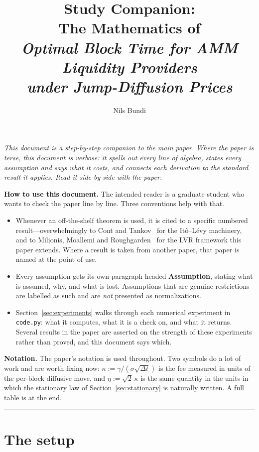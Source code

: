 \documentclass[11pt]{article}
\title{Study Companion: \\
The Mathematics of\\
\emph{Optimal Block Time for AMM Liquidity Providers\\
under Jump-Diffusion Prices}}
\author{Nils Bundi}
\date{}
\theoremstyle{definition}
\theoremstyle{remark}
\newcommand{\dt}{\Delta t}
\newcommand{\1}{\mathbf{1}}
\begin{document}
\maketitle
\tableofcontents
\vspace{1em}

\noindent\textit{This document is a step-by-step companion to the main paper. Where the paper is terse, this document is verbose: it spells out every line of algebra, states every assumption and says what it costs, and connects each derivation to the standard result it applies. Read it side-by-side with the paper.}

\medskip
\noindent\textbf{How to use this document.} The intended reader is a graduate student who wants to check the paper line by line. Three conventions help with that.
\begin{itemize}[leftmargin=2em]
\item Whenever an off-the-shelf theorem is used, it is cited to a specific numbered result---overwhelmingly to Cont and Tankov~\cite{cont2003financial} for the It\^o--L\'evy machinery, and to Milionis, Moallemi and Roughgarden~\cite{milionis2022automated,milionis2023automated} for the LVR framework this paper extends. Where a result is taken from another paper, that paper is named at the point of use.
\item Every assumption gets its own paragraph headed \textbf{Assumption}, stating what is assumed, why, and what is lost. Assumptions that are genuine restrictions are labelled as such and are \emph{not} presented as normalizations.
\item Section~\ref{sec:experiments} walks through each numerical experiment in \texttt{code.py}: what it computes, what it is a check on, and what it returns. Several results in the paper are asserted on the strength of these experiments rather than proved, and this document says which.
\end{itemize}

\medskip
\noindent\textbf{Notation.} The paper's notation is used throughout. Two symbols do a lot of work and are worth fixing now: $\kappa := \gamma/(\sigma\sqrt{\dt})$ is the fee measured in units of the per-block diffusive move, and $\eta := \sqrt2\,\kappa$ is the same quantity in the units in which the stationary law of Section~\ref{sec:stationary} is naturally written. A full table is at the end.

\bigskip
\hrule
\bigskip

\section{The setup}\label{sec:setup}
\end{document}
